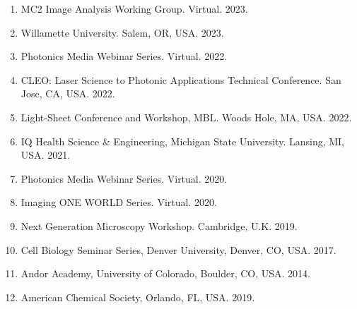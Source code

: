 \begin{enumerate}
\item MC2 Image Analysis Working Group. Virtual. 2023.
\item Willamette University.  Salem, OR, USA. 2023.
\item Photonics Media Webinar Series.   Virtual. 2022.
\item CLEO: Laser Science to Photonic Applications Technical Conference. San Jose, CA, USA. 2022.
\item Light-Sheet Conference and Workshop, MBL.  Woods Hole, MA, USA. 2022.
\item IQ Health Science \& Engineering, Michigan State University. Lansing, MI, USA. 2021.
\item Photonics Media Webinar Series.  Virtual. 2020.
\item Imaging ONE WORLD Series. Virtual. 2020.
\item Next Generation Microscopy Workshop.  Cambridge, U.K. 2019.
\item Cell Biology Seminar Series, Denver University, Denver, CO, USA. 2017.
\item Andor Academy, University of Colorado, Boulder, CO, USA. 2014.
\item American Chemical Society, Orlando, FL, USA. 2019.
\end{enumerate}